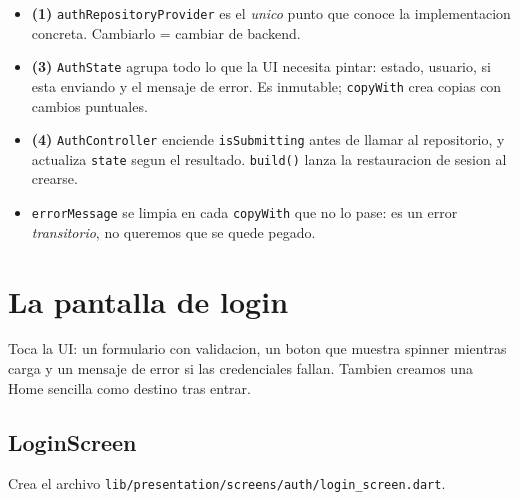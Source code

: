 \documentclass[11pt,a4paper,oneside]{book}
\newcommand{\file}[1]{\texttt{\textcolor{brandDark}{#1}}}
\begin{document}
\begin{whatbox}
\begin{itemize}
  \item \textbf{(1)} \texttt{authRepositoryProvider} es el \emph{unico} punto que
        conoce la implementacion concreta. Cambiarlo = cambiar de backend.
  \item \textbf{(3)} \texttt{AuthState} agrupa todo lo que la UI necesita pintar:
        estado, usuario, si esta enviando y el mensaje de error. Es inmutable;
        \texttt{copyWith} crea copias con cambios puntuales.
  \item \textbf{(4)} \texttt{AuthController} enciende \texttt{isSubmitting} antes de
        llamar al repositorio, y actualiza \texttt{state} segun el resultado.
        \texttt{build()} lanza la restauracion de sesion al crearse.
  \item \texttt{errorMessage} se limpia en cada \texttt{copyWith} que no lo pase: es
        un error \emph{transitorio}, no queremos que se quede pegado.
\end{itemize}
\end{whatbox}

\chapter{La pantalla de login}
Toca la UI: un formulario con validacion, un boton que muestra spinner mientras
carga y un mensaje de error si las credenciales fallan. Tambien creamos una Home
sencilla como destino tras entrar.

\section{LoginScreen}
\begin{wherebox}
Crea el archivo \file{lib/presentation/screens/auth/login\_screen.dart}.
\end{wherebox}
\end{document}
